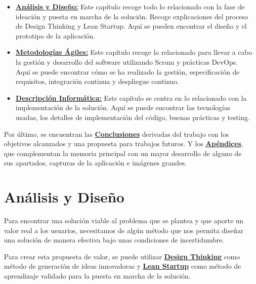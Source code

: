 \documentclass[12pt,twoside,titlepage]{report}
\newcommand\blankpage{%
    \newpage
    \null
    \thispagestyle{empty}%
    \newpage}
\begin{document}
\begin{itemize}
    \item \hyperref[sec:diseño]{\textbf{Análisis y Diseño:}} Este capítulo recoge todo lo relacionado con la fase de ideación y puesta en marcha de la solución. Recoge explicaciones del proceso de Design Thinking y Lean Startup. Aquí se pueden encontrar el diseño y el prototipo de la aplicación. %
    \item \hyperref[sec:agile]{\textbf{Metodologías Ágiles:}} Este capítulo recoge lo relacionado para llevar a cabo la gestión y desarrollo del software utilizando Scrum y prácticas DevOps. Aquí se puede encontrar cómo se ha realizado la gestión, especificación de requisitos, integración continua y despliegue continuo. %
    \item \hyperref[sec:desarrollo]{\textbf{Descripción Informática:}} Este capítulo se centra en lo relacionado con la implementación de la solución. Aquí se puede encontrar las tecnologías usadas, los detalles de implementación del código, buenas prácticas y testing. %
\end{itemize}

Por último, se encuentran las \hyperref[sec:conclusiones]{\textbf{Conclusiones}} derivadas del trabajo con los objetivos alcanzados y una propuesta para trabajos futuros. Y los \hyperref[sec:apendices]{\textbf{Apéndices}}, que complementan la memoria principal con un mayor desarrollo de alguno de sus apartados, capturas de la aplicación e imágenes grandes. %



\chapter{Análisis y Diseño}
\label{sec:diseño}
Para encontrar una solución viable al problema que se plantea y que aporte un valor real a los usuarios, necesitamos de algún método que nos permita diseñar una solución de manera efectiva bajo unas condiciones de incertidumbre.

Para crear esta propuesta de valor, se puede utilizar \hyperref[sec:design]{\textbf{Design Thinking}} como método de generación de ideas innovadoras y \hyperref[sec:lean]{\textbf{Lean Startup}} como método de aprendizaje validado para la puesta en marcha de la solución.
\cite{analisis}
\end{document}
